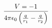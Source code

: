 \documentclass[preview]{standalone}
\begin{document}
\begin{align*}
V  =  -1 \over 4\pi\epsilon_0  \left( \frac{q}{r_1} - \frac{q}{r_2} \right)
\end{align*}
\end{document}
